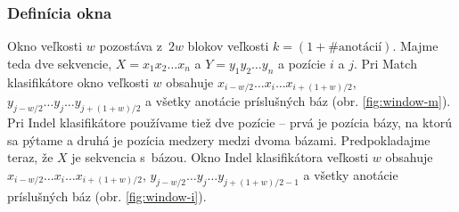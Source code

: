\subsubsection{Definícia okna}
Okno veľkosti $w$ pozostáva z~$2w$ blokov veľkosti $k = (1+\#\text{anotácií})$.
Majme teda dve sekvencie, $X = x_1 x_2 \dots x_n$ a $Y = y_1 y_2 \dots y_n$ a pozície $i$ a $j$.
Pri Match klasifikátore okno veľkosti $w$ obsahuje $x_{i - w/2}\dots x_i \dots x_{i + (1 + w)/2}$, $y_{j - w/2}\dots y_j \dots y_{j + (1 + w)/2}$ a všetky anotácie príslušných báz (obr. \ref{fig:window-m}).
Pri Indel klasifikátore používame tiež dve pozície -- prvá je pozícia bázy, na ktorú sa pýtame a druhá je pozícia medzery medzi dvoma bázami.
Predpokladajme teraz, že $X$ je sekvencia s~bázou. Okno Indel klasifikátora veľkosti $w$ obsahuje $x_{i - w/2}\dots x_i \dots x_{i + (1 + w)/2}$, $y_{j - w/2}\dots y_j \dots y_{j + (1 + w)/2 - 1}$ a všetky anotácie príslušných báz (obr. \ref{fig:window-i}).

